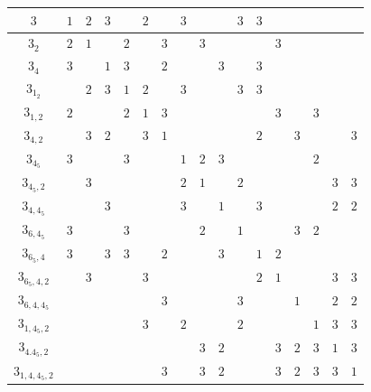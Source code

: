 \documentclass{amsart}
\theoremstyle{definition}
\theoremstyle{remark}
\begin{document}
\begin{table}
\begin{tabular}{|c||c|c|c|c|c|c|c|c|c|c|c|c|c|c|c|c|}
\hhline{|=#=|=|=|=|=|=|=|=|=|=|=|=|=|=|=|=|}
$3$ & $1$ & $2$  & $3$  &  & $2$  &  & $3$ & &  & $3$ & $3$ & & & & & \\ \hline
$3_2$ & $2$  & $1$ &  & $2$  &   & $3$ &  & $3$ & & & & $3$ & & & & \\ \hline
$3_4$ & $3$ &  & $1$ & $3$ &  & $2$ &  & & $3$ & & $3$ & & & & & \\ \hline
$3_{1_2}$ &  & $2$ & $3$ & $1$ & $2$ &  & $3$ &  & & $3$ & $3$ & & & & & \\ \hline
$3_{1,2}$ & $2$  &  &  & $2$ & $1$ & $3$ &  & & & & & $3$ &  & $3$ & & \\ \hline
$3_{4,2}$ &  & $3$  & $2$ &  & $3$ & $1$ &  &  & & & $2$ & & $3$ & & & $3$ \\ \hline
$3_{4_5}$ & $3$ &  &  & $3$ &  &  & $1$ & $2$ & $3$ & & & & & $2$ &  & \\ \hline
$3_{4_5,2}$ &  & $3$ &  &  &  &  & $2$ & $1$ & & $2$ & & & & & $3$ & $3$ \\ \hline
$3_{4,4_5}$ &  & & $3$ & & & & $3$ & & $1$ &  & $3$ & &  & & $2$ & $2$ \\ \hline
$3_{6,4_5}$ & $3$ & & & $3$ & & & & $2$ &  & $1$ & &  & $3$ & $2$ & & \\ \hline
$3_{6_5,4}$ & $3$ & & $3$ & $3$ & & $2$ & & & $3$ & & $1$ & $2$ & & &  & \\ \hline
$3_{6_5,4,2}$ & & $3$ & & & $3$ & & & & &  & $2$ & $1$ & & & $3$ & $3$ \\ \hline
$3_{6,4,4_5}$ & & & & &  & $3$ & & &  & $3$ & & & $1$ &  & $2$ & $2$ \\ \hline
$3_{1,4_5,2}$ & & & & & $3$ & & $2$ & & & $2$ & & &  & $1$ & $3$ & $3$ \\ \hline
$3_{4.4_5,2}$ & & & & & & &  & $3$ & $2$ & &  & $3$ & $2$ & $3$ & $1$ & $3$  \\ \hline
$3_{1,4,4_5,2}$ & & & & & & $3$ & & $3$ & $2$ & & & $3$ & $2$ & $3$ & $3$ & $1$ \\ \hline
\end{tabular}

\vspace{20pt}



\end{table}
\end{document}

